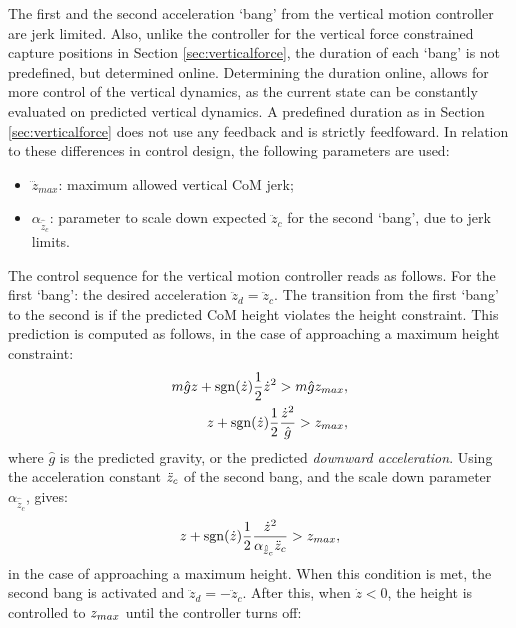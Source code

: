 The first and the second acceleration `bang' from the vertical motion controller are jerk limited. Also, unlike the controller for the vertical force constrained capture positions in Section \ref{sec:verticalforce}, the duration of each `bang' is not predefined, but determined online. Determining the duration online, allows for more control of the vertical dynamics, as the current state can be constantly evaluated on predicted vertical dynamics. A predefined duration as in Section \ref{sec:verticalforce} does not use any feedback and is strictly feedfoward. In relation to these differences in control design, the following parameters are used:
\begin{itemize}
	\item $\dddot{z}_{max}$: maximum allowed vertical CoM jerk;
	\item $\alpha_{\hat{\ddot{z}}_{c}}$: parameter to scale down expected $\ddot{z}_c$ for the second `bang', due to jerk limits.
\end{itemize}
The control sequence for the vertical motion controller reads as follows. For the first `bang': the desired acceleration $\ddot{z}_d=\ddot{z}_c$. The transition from the first `bang' to the second is if the predicted \ac{CoM} height violates the height constraint. This prediction is computed as follows, in the case of approaching a maximum height constraint:
\begin{align}
	m\hat{g}z + \operatorname{sgn}(\dot{z})\frac{1}{2}\dot{z}^2>m\hat{g}z_{max},\\
	z + \operatorname{sgn}(\dot{z})\frac{1}{2}\frac{\dot{z}^2}{\hat{g}}>z_{max},
\end{align}
where $\hat{g}$ is the predicted gravity, or the predicted \textit{downward acceleration}. Using the acceleration constant $\ddot{z}_{c}$ of the second bang, and the scale down parameter $\alpha_{\hat{\ddot{z}}_{c}}$, gives:
\begin{equation}
	z+\operatorname{sgn}(\dot{z})\frac{1}{2}\frac{\dot{z}^2}{\alpha_{\hat{\ddot{z}}_{c}}\ddot{z}_{c}} >z_{max},
\end{equation}
in the case of approaching a maximum height. When this condition is met, the second bang is activated and $\ddot{z}_d=-\ddot{z}_c$. After this, when $\dot{z}<0$, the height is controlled to $z_{max}$ until the controller turns off:
